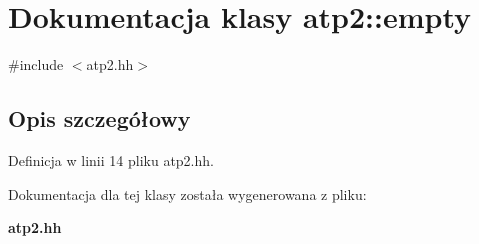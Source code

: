 \section{Dokumentacja klasy atp2\+:\+:empty}
\label{classatp2_1_1empty}


{\ttfamily \#include $<$atp2.\+hh$>$}



\subsection{Opis szczegółowy}


Definicja w linii 14 pliku atp2.\+hh.



Dokumentacja dla tej klasy została wygenerowana z pliku\+:\begin{DoxyCompactItemize}
\item 
{\bf atp2.\+hh}\end{DoxyCompactItemize}
